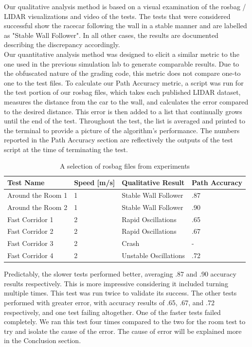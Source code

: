\documentclass{article}
\begin{document}
Our qualitative analysis method is based on a visual examination of the rosbag / LIDAR visualizations and video of the tests. The tests that were considered successful show the racecar following the wall in a stable manner and are labelled as "Stable Wall Follower". In all other cases, the results are documented describing the discrepancy accordingly.\\

Our quantitative analysis method was designed to elicit a similar metric to the one used in the previous simulation lab to generate comparable results. Due to the obfuscated nature of the grading code, this metric does not compare one-to one to the test files. To calculate our Path Accuracy metric, a script was run for the test portion of our rosbag files, which takes each published LIDAR dataset, measures the distance from the car to the wall, and calculates the error compared to the desired distance. This error is then added to a list that continually grows until the end of the test. Throughout the test, the list is averaged and printed to the terminal to provide a picture of the algorithm's performance. The numbers reported in the Path Accuracy section are reflectively the outputs of the test script at the time of terminating the test.\\

\begin{table}[htbp]
    \centering
    \title{}
    \begin{tabularx}{\textwidth}{| X | X | X | X |}
        \hline
        Test Name & Speed [m/s] & Qualitative Result & Path Accuracy \\ \hline
        Around the Room 1 & 1 & Stable Wall Follower & .87 \\ 
        Around the Room 2 & 1 & Stable Wall Follower & .90 \\ 
        Fast Corridor 1 & 2 & Rapid Oscillations & .65 \\ 
        Fast Corridor 2 & 2 & Rapid Oscillations & .67 \\ 
        Fast Corridor 3 & 2 & Crash & - \\ 
        Fast Corridor 4 & 2 & Unstable Oscillations & .72 \\ \hline
    \end{tabularx}
    \caption{A selection of rosbag files from experiments}
\end{table}

Predictably, the slower tests performed better, averaging .87 and .90 accuracy results respectively. This is more impressive considering it included turning multiple times. This test was run twice to validate its success. The other tests performed with greater error, with accuracy results of .65, .67, and .72 respectively, and one test failing altogether. One of the faster tests failed completely. We ran this test four times compared to the two for the room test to try and isolate the cause of the error. The cause of error will be explained more in the Conclusion section.
\end{document}
